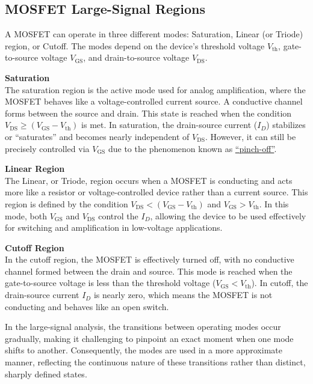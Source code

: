 \documentclass[
  letterpaper,
]{scrbook}
\begin{document}
\subsection{MOSFET Large-Signal
Regions}\label{mosfet-large-signal-regions}

A MOSFET can operate in three different modes: Saturation, Linear (or
Triode) region, or Cutoff. The modes depend on the device's threshold
voltage \(V_{\text{th}}\), gate-to-source voltage \(V_{\text{GS}}\), and
drain-to-source voltage \(V_{\text{DS}}\).

\textbf{Saturation}\\
The saturation region is the active mode used for analog amplification,
where the MOSFET behaves like a voltage-controlled current source. A
conductive channel forms between the source and drain. This state is
reached when the condition
\(V_{\text{DS}} \geq (V_{\text{GS}} - V_{\text{th}})\) is met. In
saturation, the drain-source current (\(I_D\)) stabilizes or
``saturates'' and becomes nearly independent of \(V_{\text{DS}}\).
However, it can still be precisely controlled via \(V_{\text{GS}}\) due
to the phenomenon known as
\href{https://en.wikipedia.org/wiki/Channel_length_modulation}{``pinch-off''}.

\textbf{Linear Region}\\
The Linear, or Triode, region occurs when a MOSFET is conducting and
acts more like a resistor or voltage-controlled device rather than a
current source. This region is defined by the condition
\(V_{\text{DS}} < (V_{\text{GS}} - V_{\text{th}})\) and
\(V_{\text{GS}} > V_{\text{th}}\). In this mode, both \(V_{\text{GS}}\)
and \(V_{\text{DS}}\) control the \(I_D\), allowing the device to be
used effectively for switching and amplification in low-voltage
applications.

\textbf{Cutoff Region}\\
In the cutoff region, the MOSFET is effectively turned off, with no
conductive channel formed between the drain and source. This mode is
reached when the gate-to-source voltage is less than the threshold
voltage (\(V_{\text{GS}} < V_{\text{th}}\)). In cutoff, the drain-source
current \(I_D\) is nearly zero, which means the MOSFET is not conducting
and behaves like an open switch.

\begin{tcolorbox}[enhanced jigsaw, title=\textcolor{quarto-callout-warning-color}{\faExclamationTriangle}\hspace{0.5em}{Warning}, colback=white, bottomrule=.15mm, coltitle=black, colbacktitle=quarto-callout-warning-color!10!white, toptitle=1mm, colframe=quarto-callout-warning-color-frame, rightrule=.15mm, arc=.35mm, leftrule=.75mm, bottomtitle=1mm, titlerule=0mm, toprule=.15mm, opacitybacktitle=0.6, opacityback=0, left=2mm, breakable]

In the large-signal analysis, the transitions between operating modes
occur gradually, making it challenging to pinpoint an exact moment when
one mode shifts to another. Consequently, the modes are used in a more
approximate manner, reflecting the continuous nature of these
transitions rather than distinct, sharply defined states.

\end{tcolorbox}
\end{document}
